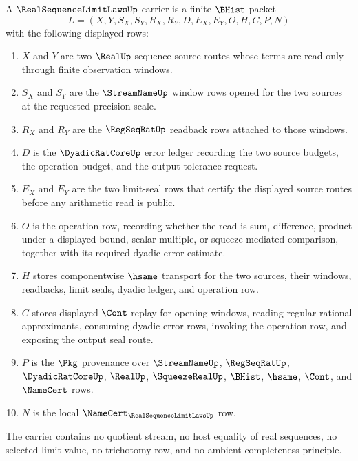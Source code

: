 \begin{definition}
\label{def:real-sequence-limit-laws-carrier}
A $\RealSequenceLimitLawsUp$ carrier is a finite $\BHist$ packet
$$
L=(X,Y,S_X,S_Y,R_X,R_Y,D,E_X,E_Y,O,H,C,P,N)
$$
with the following displayed rows:
\begin{enumerate}
\item $X$ and $Y$ are two $\RealUp$ sequence source routes whose terms are read
only through finite observation windows.
\item $S_X$ and $S_Y$ are the $\StreamNameUp$ window rows opened for the two
sources at the requested precision scale.
\item $R_X$ and $R_Y$ are the $\RegSeqRatUp$ readback rows attached to those
windows.
\item $D$ is the $\DyadicRatCoreUp$ error ledger recording the two source
budgets, the operation budget, and the output tolerance request.
\item $E_X$ and $E_Y$ are the two limit-seal rows that certify the displayed
source routes before any arithmetic read is public.
\item $O$ is the operation row, recording whether the read is sum, difference,
product under a displayed bound, scalar multiple, or squeeze-mediated
comparison, together with its required dyadic error estimate.
\item $H$ stores componentwise $\hsame$ transport for the two sources, their
windows, readbacks, limit seals, dyadic ledger, and operation row.
\item $C$ stores displayed $\Cont$ replay for opening windows, reading regular
rational approximants, consuming dyadic error rows, invoking the operation
row, and exposing the output seal route.
\item $P$ is the $\Pkg$ provenance over $\StreamNameUp$, $\RegSeqRatUp$,
$\DyadicRatCoreUp$, $\RealUp$, $\SqueezeRealUp$, $\BHist$, $\hsame$, $\Cont$,
and $\NameCert$ rows.
\item $N$ is the local $\NameCert_{\RealSequenceLimitLawsUp}$ row.
\end{enumerate}
The carrier contains no quotient stream, no host equality of real sequences,
no selected limit value, no trichotomy row, and no ambient completeness
principle.
\end{definition}

